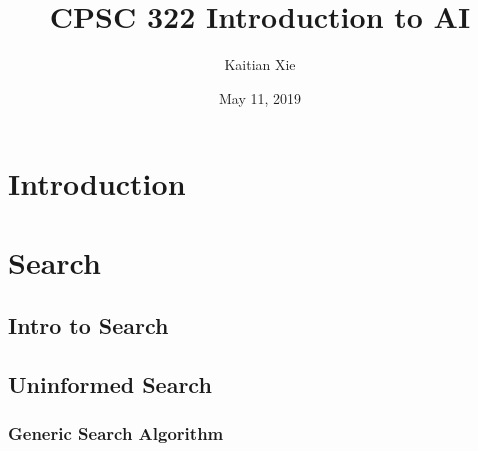 \documentclass{article}
\title{CPSC 322 Introduction to AI}
\author{Kaitian Xie}
\date{May 11, 2019}
\begin{document}
\maketitle
\pagebreak

\section{Introduction}

\section{Search}

\subsection{Intro to Search}

\subsection{Uninformed Search}

\subsubsection{Generic Search Algorithm}
\end{document}
